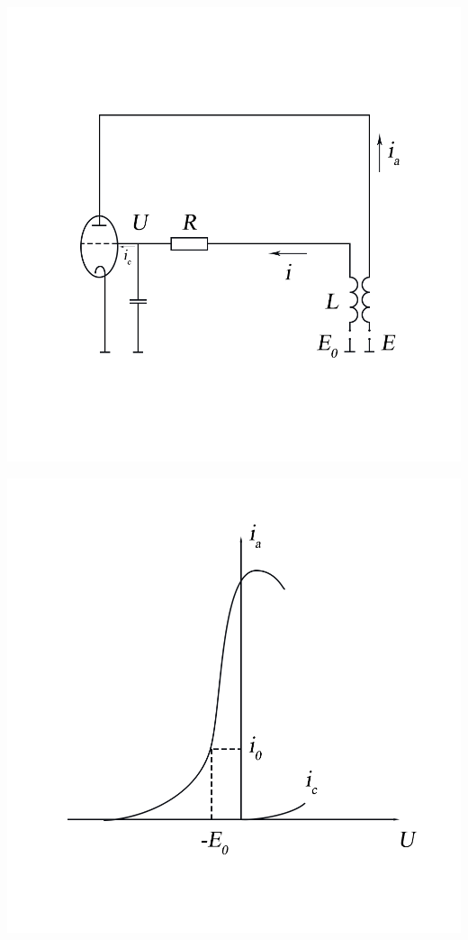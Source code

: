 \begin{center}
    \begin{minipage}{0.49\linewidth}
        \includegraphics[width=\linewidth]{pics/Ris3.png} 
        \vspace{-60pt}
        \label{fig:3}
    \end{minipage}
\hfill     
    \begin{minipage}{0.49\linewidth}
        \centering
        \includegraphics[width=\linewidth]{pics/Ris4.png}  
        \vspace{-60pt}
        \label{fig:4}
    \end{minipage} 
\end{center}   

